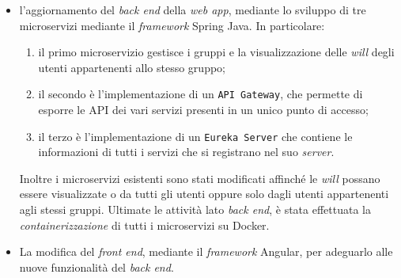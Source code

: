 \begin{itemize}
      \item l'aggiornamento del \textit{back
                  end} della \textit{web app}, mediante lo sviluppo di tre
            microservizi
            mediante il \textit{framework} Spring Java.
            In particolare:
            \begin{enumerate}
                  \item il primo microservizio	gestisce i gruppi e la
                        visualizzazione delle
                        \textit{will}
                        degli utenti appartenenti allo stesso gruppo;
                  \item il secondo è l'implementazione di un
                        \texttt{API Gateway}, che permette di esporre le
                        \gls{API} dei vari servizi
                        presenti in un
                        unico punto di accesso;
                  \item il terzo è l'implementazione di un \texttt{Eureka
                              Server}
                        che
                        contiene le informazioni di tutti i servizi che si
                        registrano nel suo \textit{server}.
            \end{enumerate}
            Inoltre i microservizi esistenti sono stati modificati affinché le
            \textit{will} possano essere visualizzate o da tutti gli utenti
            oppure solo
            dagli utenti appartenenti agli stessi gruppi.
            Ultimate le attività lato \textit{back end}, è stata effettuata la
            \textit{containerizzazione} di tutti i microservizi su
            Docker.
      \item La modifica del \textit{front end},
            mediante il \textit{framework} Angular, per adeguarlo alle nuove
            funzionalità del
            \textit{back end}.
\end{itemize}

%
%

\endgroup

\vfill